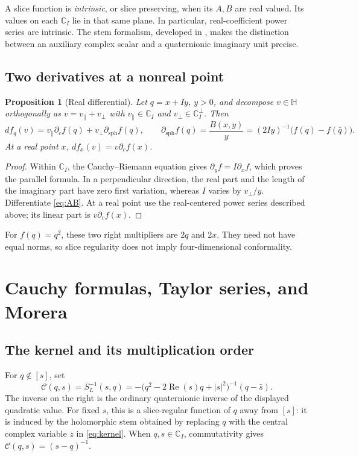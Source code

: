 \documentclass[11pt,a4paper]{article}
\numberwithin{equation}{section}
\newtheorem{proposition}[theorem]{Proposition}
\theoremstyle{definition}
\theoremstyle{remark}
\newcommand{\C}{\mathbb C}
\newcommand{\HH}{\mathbb H}
\newcommand{\Rea}{\operatorname{Re}}
\newcommand{\cC}{\mathcal C}
\newcommand{\sph}{\partial_{\mathrm{sph}}}
\newcommand{\pc}{\partial_c}
\begin{document}
A slice function is \emph{intrinsic}, or slice preserving, when its $A,B$ are
real valued. Its values on each $\C_I$ lie in that same plane. In particular,
real-coefficient power series are intrinsic. The stem formalism, developed in
\cite{GP}, makes the distinction between an auxiliary complex scalar and a
quaternionic imaginary unit precise.

\subsection{Two derivatives at a nonreal point}
\begin{proposition}[Real differential]
\label{prop:differential}
Let $q=x+Iy$, $y>0$, and decompose $v\in\HH$ orthogonally as
$v=v_\parallel+v_\perp$ with $v_\parallel\in\C_I$ and
$v_\perp\in\C_I^\perp$. Then
\begin{equation}
 df_q(v)=v_\parallel\pc f(q)+v_\perp\sph f(q),\qquad
 \sph f(q)=\frac{B(x,y)}{y}
 =(2Iy)^{-1}\bigl(f(q)-f(\bar q)\bigr).
 \label{eq:differential}
\end{equation}
At a real point $x$, $df_x(v)=v\pc f(x)$.
\end{proposition}
\begin{proof}
Within $\C_I$, the Cauchy--Riemann equation gives
$\partial_yf=I\partial_xf$, which proves the parallel formula. In a
perpendicular direction, the real part and the length of the imaginary part
have zero first variation, whereas $I$ varies by $v_\perp/y$. Differentiate
\eqref{eq:AB}. At a real point use the real-centered power series described
above; its linear part is $v\pc f(x)$.
\end{proof}
For $f(q)=q^2$, these two right multipliers are $2q$ and $2x$.
They need not have equal norms, so slice regularity does not imply
four-dimensional conformality.

\section{Cauchy formulas, Taylor series, and Morera}
\label{sec:cauchy-slice}
\subsection{The kernel and its multiplication order}
For $q\notin[s]$, set
\begin{equation}
 \cC(q,s)=S_L^{-1}(s,q)
 =-\bigl(q^2-2\Rea(s)q+|s|^2\bigr)^{-1}(q-\bar s).
 \label{eq:kernel}
\end{equation}
The inverse on the right is the ordinary quaternionic inverse of the displayed
quadratic value. For fixed $s$, this is a slice-regular function of $q$ away
from $[s]$: it is induced by the holomorphic stem obtained by replacing $q$
with the central complex variable $z$ in \eqref{eq:kernel}. When $q,s\in\C_I$,
commutativity gives $\cC(q,s)=(s-q)^{-1}$.
\end{document}
